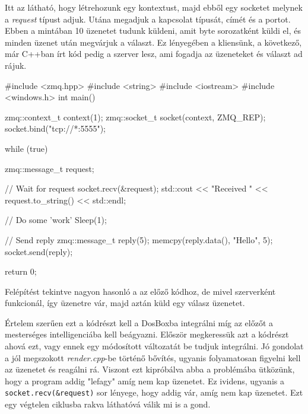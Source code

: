 Itt az látható, hogy létrehozunk egy kontextust, majd ebből egy socketet melynek a \textit{request} típust adjuk. 
Utána megadjuk a kapcsolat típusát, címét és a portot. Ebben a mintában 10 üzenetet tudunk küldeni, amit byte sorozatként küldi el, és minden üzenet után megvárjuk a választ. Ez lényegében a kliensünk, a következő, már C++ban írt kód pedig a szerver lesz, ami fogadja az üzeneteket és választ ad rájuk.

\begin{cpp}
    #include <zmq.hpp>
    #include <string>
    #include <iostream>
    #include <windows.h>
    int main()
    {
        zmq::context_t context(1);
        zmq::socket_t socket(context, ZMQ_REP);
        socket.bind("tcp://*:5555");
    
        while (true) {
            zmq::message_t request;
    
            //  Wait for request
            socket.recv(&request);
            std::cout << "Received " << request.to_string() << std::endl;
    
            //  Do some 'work'
            Sleep(1);
    
            //  Send reply 
            zmq::message_t reply(5);
            memcpy(reply.data(), "Hello", 5);
            socket.send(reply);
        }
        return 0;
    }
\end{cpp}

Felépítést tekintve nagyon hasonló a az előző kódhoz, de mivel szerverként funkcionál, így üzenetre vár, majd aztán küld egy válasz üzenetet. 

Értelem szerűen ezt a kódrészt kell a DosBoxba integrálni míg az előzőt a mesterséges intelligenciába kell beágyazni. Először megkeressük azt a kódrészt ahová ezt, vagy ennek egy módosított változatát be tudjuk integrálni. Jó gondolat a jól megszokott \textit{render.cpp}-be történő bővítés, ugyanis folyamatosan figyelni kell az üzenetet és reagálni rá. Viszont ezt kipróbálva abba a problémába ütközünk, hogy a program addig "lefagy" amíg nem kap üzenetet. Ez ividens, ugyanis a \verb|socket.recv(&request)| sor lényege, hogy addig vár, amíg nem kap üzenetet. Ezt egy végtelen ciklusba rakva láthatóvá válik mi is a gond.

